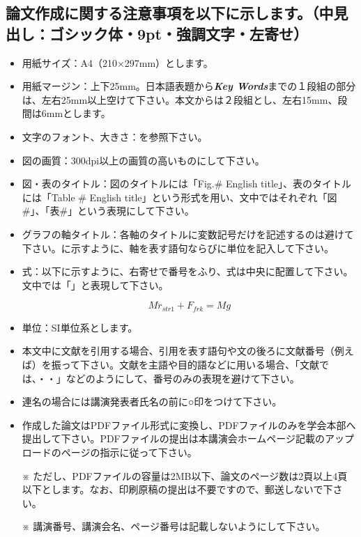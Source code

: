 \documentclass{jarticle}
\begin{document}
\subsection{論文作成に関する注意事項を以下に示します。（中見出し：ゴシック体・9pt・強調文字・左寄せ）}%
\begin{itemize}
	\item 用紙サイズ：A4（210×297mm）とします。
	\item 用紙マージン：上下25mm。日本語表題から\textbf{\textit{Key Words}}までの１段組の部分は、左右25mm以上空けて下さい。本文からは２段組とし、左右15mm、段間は6mmとします。
	\item 文字のフォント、大きさ：を参照下さい。
	\item 図の画質：300dpi以上の画質の高いものにして下さい。
	\item 図・表のタイトル：図のタイトルには「Fig.\# English title」、表のタイトルには「Table \# English title」という形式を用い、文中ではそれぞれ「図\#」、「表\#」という表現にして下さい。
	\item グラフの軸タイトル：各軸のタイトルに変数記号だけを記述するのは避けて下さい。に示すように、軸を表す語句ならびに単位を記入して下さい。
	\item 式：以下に示すように、右寄せで番号をふり、式は中央に配置して下さい。文中では「」と表現して下さい。
	
	\begin{equation}
		M\ddot{r}_{str1} + F_{frk} = Mg
		\label{eqn: eq1}
	\end{equation}

	\item 単位：SI単位系とします。
	\item 本文中に文献を引用する場合、引用を表す語句や文の後ろに文献番号（例えば\cite{Shinjuku98}）を振って下さい。文献を主語や目的語などに用いる場合、「文献\cite{Shinjuku98}では、・・」などのようにして、番号のみの表現を避けて下さい。
	\item 連名の場合には講演発表者氏名の前に○印をつけて下さい。
	\item 作成した論文はPDFファイル形式に変換し、PDFファイルのみを学会本部へ提出して下さい。PDFファイルの提出は本講演会ホームページ記載のアップロードのページの指示に従って下さい。
	\item[]
	\item[※] ただし、PDFファイルの容量は2MB以下、論文のページ数は2頁以上4頁以下とします。なお、印刷原稿の提出は不要ですので、郵送しないで下さい。
	\item[※] 講演番号、講演会名、ページ番号は記載しないようにして下さい。
\end{itemize}
\end{document}
